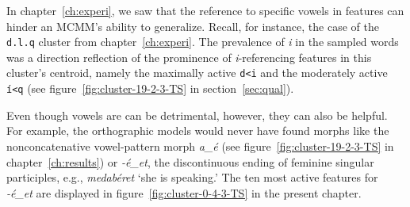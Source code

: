 In chapter~\ref{ch:experi}, we saw that the reference to specific vowels in features can 
hinder an MCMM's ability to generalize. Recall, for instance, the case of the \texttt{d.l.q} 
cluster from chapter~\ref{ch:experi}. The prevalence 
of \textit{i} in the sampled words was a direction reflection of the prominence of 
\textit{i}-referencing features in this cluster's centroid, namely the maximally 
active \texttt{d<i} and the moderately active \texttt{\'{i}<q} (see figure~\ref{fig:cluster-19-2-3-TS} in section~\ref{sec:qual}).

Even though vowels are can be detrimental, however, they can also be helpful. For example, the orthographic models would never have found morphs like the nonconcatenative vowel-pattern morph \textit{a\_\'{e}} (see figure~\ref{fig:cluster-19-2-3-TS} in chapter~\ref{ch:results}) or \textit{-\'{e}\_et}, the discontinuous ending of  feminine singular participles, e.g., \textit{medab\'{e}ret} `she is speaking.' The ten most active features for \textit{-\'{e}\_et} are displayed in figure~\ref{fig:cluster-0-4-3-TS} in the present chapter.

